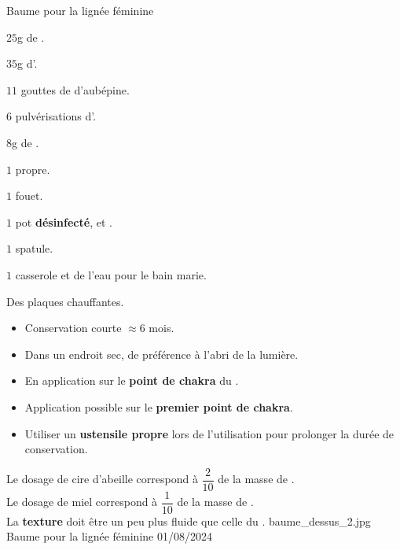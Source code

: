 
\ficherecette
{%
    Baume pour la lignée féminine
}
{%
    \item $25$g de .
    \item $35$g d'.
    \item $11$ gouttes de \teinture d'aubépine.
    \item $6$ pulvérisations d'.
    \item $8$g de .
}
{%
    \item $1$  propre. 
    \item $1$ fouet. 
    \item $1$ pot \textbf{désinfecté},  et .
    \item $1$ spatule. 
    \item $1$ casserole et de l'eau pour le bain marie. 
    \item Des plaques chauffantes.  
}
{%
    \begin{itemize}[label=\faPen]
        \item Conservation courte $\approx 6$ mois.
        \item Dans un endroit sec, de préférence à l'abri de la lumière. 
    \end{itemize}
}
{%
    \begin{itemize}[label=\faPen]
        \item En application sur le \textbf{point de chakra} du .
        \item Application possible sur le \textbf{premier point de chakra}.
        \item Utiliser un \textbf{ustensile propre} lors de l'utilisation pour prolonger la durée de conservation. 
    \end{itemize}
}
{%
    Le dosage de cire d'abeille correspond à $\dfrac{2}{10}$ de la masse de \macerat.\\
    Le dosage de miel correspond à $\dfrac{1}{10}$ de la masse de \macerat.\\
    La \textbf{texture} doit être un peu plus fluide que celle du .
}
{%
    baume_dessus_2.jpg    
}
{%
    Baume pour la lignée féminine
}
{%
    01/08/2024
}